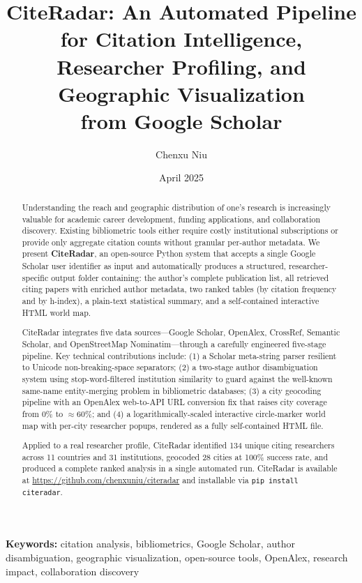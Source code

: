 \documentclass[11pt]{article}
\title{%
  \textbf{CiteRadar: An Automated Pipeline for Citation Intelligence,\\
  Researcher Profiling, and Geographic Visualization\\
  from Google Scholar}%
}
\author[1]{Chenxu Niu}
\affil[1]{NVIDIA Corporation; Texas Tech University\\
  \texttt{chenxu.niu@ttu.edu}}
\date{April 2025}
\begin{document}
\maketitle

\begin{abstract}
Understanding the reach and geographic distribution of one's research is
increasingly valuable for academic career development, funding applications,
and collaboration discovery.
Existing bibliometric tools either require costly institutional subscriptions
or provide only aggregate citation counts without granular per-author metadata.
We present \textbf{CiteRadar}, an open-source Python system that accepts a
single Google Scholar user identifier as input and automatically produces a
structured, researcher-specific output folder containing: the author's complete
publication list, all retrieved citing papers with enriched author metadata,
two ranked tables (by citation frequency and by h-index), a plain-text
statistical summary, and a self-contained interactive HTML world map.

CiteRadar integrates five data sources—Google Scholar, OpenAlex, CrossRef,
Semantic Scholar, and OpenStreetMap Nominatim—through a carefully engineered
five-stage pipeline.
Key technical contributions include: (1) a Scholar meta-string parser
resilient to Unicode non-breaking-space separators; (2) a two-stage author
disambiguation system using stop-word-filtered institution similarity to guard
against the well-known same-name entity-merging problem in bibliometric
databases; (3) a city geocoding pipeline with an OpenAlex web-to-API URL
conversion fix that raises city coverage from 0\% to $\approx$60\%;
and (4) a logarithmically-scaled interactive circle-marker world map with
per-city researcher popups, rendered as a fully self-contained HTML file.

Applied to a real researcher profile, CiteRadar identified 134 unique citing
researchers across 11 countries and 31 institutions, geocoded 28 cities at
100\% success rate, and produced a complete ranked analysis in a single
automated run.
CiteRadar is available at \url{https://github.com/chenxuniu/citeradar}
and installable via \texttt{pip install citeradar}.
\end{abstract}

\noindent\textbf{Keywords:} citation analysis, bibliometrics, Google Scholar,
author disambiguation, geographic visualization, open-source tools, OpenAlex,
research impact, collaboration discovery
\end{document}
